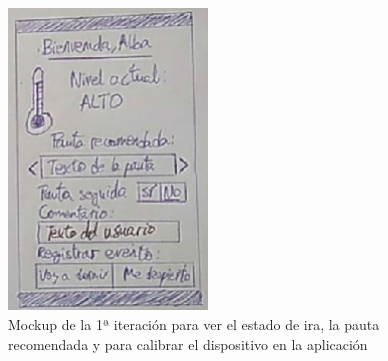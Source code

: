 \begin{figure}[H]
    \centering
    \includegraphics[width=0.4\linewidth, height=8cm]{Imagenes/04DescProblema/mockups/v1/android/01-principal-2.png}
    \caption[Mockup de la 1ª iteración para ver el estado de ira, la pauta recomendada y para calibrar el dispositivo en la aplicación]{Mockup de la 1ª iteración para ver el estado de ira, la pauta recomendada  y para calibrar el dispositivo en la aplicación}
    \label{c4:fig:v1:android:principal2}
\end{figure}

